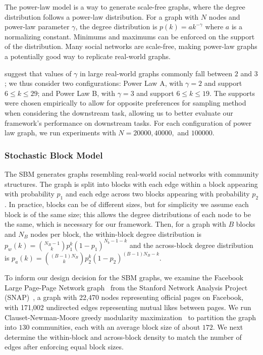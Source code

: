 The power-law model is a way to generate scale-free graphs, where the degree distribution follows a power-law distribution. For a graph with $N$ nodes and power-law parameter $\gamma$, the degree distribution is $p(k) = ak^{-\gamma}$ where $a$ is a normalizing constant. Minimums and maximums can be enforced on the support of the distribution. Many social networks are scale-free, making power-law graphs a potentially good way to replicate real-world graphs.

\citet{barabasi1999emergence} suggest that values of $\gamma$ in large real-world graphs commonly fall between $2$ and $3$; we thus consider two configurations: Power Law A, with $\gamma = 2$ and support $6 \leq k \leq 29$; and Power Law B, with $\gamma = 3$ and support $6 \leq k \leq 19$. The supports were chosen empirically to allow for opposite preferences for sampling method when considering the downstream task, allowing us to better evaluate our framework's performance on downstream tasks. For each configuration of power law graph, we run experiments with $N = 20000, 40000,$ and $100000$.

\subsubsection{Stochastic Block Model}

The SBM generates graphs resembling real-world social networks with community structures. The graph is split into blocks with each edge within a block appearing with probability $p_1$ and each edge across two blocks appearing with probability $p_2$. In practice, blocks can be of different sizes, but for simplicity we assume each block is of the same size; this allows the degree distributions of each node to be the same, which is necessary for our framework. Then, for a graph with $B$ blocks and $N_B$ nodes per block, the within-block degree distribution is $p_w(k)=\binom{N_B-1}{k}p_1^{k}(1-p_1)^{N_b-1-k}$ and the across-block degree distribution is $p_a(k) = \binom{(B-1)N_B}{k}p_2^k (1-p_2)^{(B-1)N_B-k}$.

To inform our design decision for the SBM graphs, we examine the Facebook Large Page-Page Network graph~\cite{rozemberczki2019multiscale} from the Stanford Network Analysis Project (SNAP)~\cite{snapnets}, a graph with 22,470 nodes representing official pages on Facebook, with 171,002 undirected edges representing mutual likes between pages. We run Clauset-Newman-Moore greedy modularity maximization~\cite{clauset2004finding} to partition the graph into $130$ communities, each with an average block size of about $172$. We next determine the within-block and across-block density to match the number of edges after enforcing equal block sizes.

